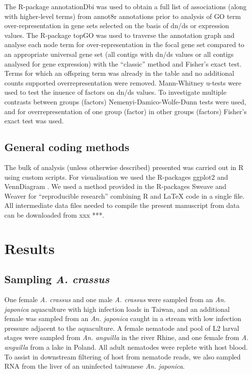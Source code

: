 \documentclass[10pt]{bmc_article}
\newenvironment{bmcformat}{\begin{raggedright}\baselineskip20pt\sloppy\setboolean{publ}{false}}{\end{raggedright}\baselineskip20pt\sloppy}
\begin{document}
\begin{bmcformat}
The R-package annotationDbi \cite{AnnotationDbi} was used to obtain a
full list of associations (along with higher-level terms) from annot8r
annotations prior to analysis of GO term over-representation in gene
sets selected on the basis of dn/ds or expression values. The
R-package topGO \cite{topGO} was used to traverse the annotation graph
and analyse each node term for over-representation in the focal gene
set compared to an appropriate universal gene set (all contigs with
dn/ds values or all contigs analysed for gene expression) with the
``classic'' method and Fisher's exact test. Terms for which an
offspring term was already in the table and no additional counts
supported overrepresentation were removed. Mann-Whitney u-tests were
used to test the inuence of factors on dn/ds values. To investigate
multiple contrasts between groups (factors) Nemenyi-Damico-Wolfe-Dunn
tests were used, and for overrepresentation of one group (factor) in
other groups (factors) Fisher's exact test was used.

\subsection*{General coding methods}

The bulk of analysis (unless otherwise described) presented was
carried out in R \cite{R_project} using custom scripts. For
visualisation we used the R-packages ggplot2 \cite{ggplot-book} and
VennDiagram \cite{pmid21269502}. We used a method provided in the
R-packages Sweave \cite{lmucs-papers:Leisch:2002} and Weaver
\cite{weaver} for ``reproducible research'' combining R and \LaTeX
code in a single file. All intermediate data files needed to compile
the present manuscript from data can be downloaded from xxx ***.


\section*{Results}


\subsection*{Sampling \textit{A. crassus}}


One female \textit{A. crassus} and one male \textit{A. crassus} were
sampled from an \textit{An. japonica} aquaculture with high infection
loads in Taiwan, and an additional female was sampled from an
\textit{An. japonica} caught in a stream with low infection pressure
adjacent to the aquaculture. A female nematode and pool of L2 larval
stages were sampled from \textit{An. anguilla} in the river Rhine, and
one female from \textit{A. anguilla} from a lake in Poland. All adult
nematodes were replete with host blood. To assist in downstream
filtering of host from nematode reads, we also sampled RNA from the
liver of an uninfected taiwanese \textit{An. japonica}.


\end{bmcformat}
\end{document}
